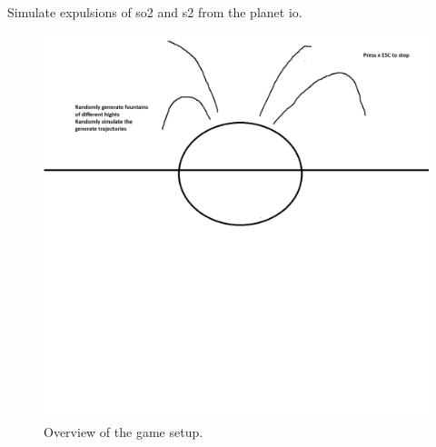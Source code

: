 \documentclass[12pt]{article}
\begin{document}
    \maketitle
    Simulate expulsions of so2 and s2 from the planet io.
    \begin{figure}
        \caption{Overview of the game setup.}
        \centering
        \includegraphics[scale=.4]{visuals.png}
    \end{figure}
\end{document}
